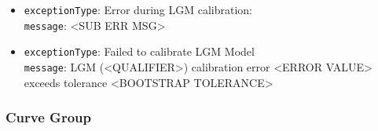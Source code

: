 \begin{itemize}
  \item \lstinline!exceptionType!: Error during LGM calibration: \\
        \lstinline!message!: <SUB ERR MSG>

  \item \lstinline!exceptionType!: Failed to calibrate LGM Model \\
        \lstinline!message!: LGM (<QUALIFIER>) calibration error <ERROR VALUE> exceeds tolerance <BOOTSTRAP TOLERANCE>


\end{itemize}

\subsubsection*{Curve Group}


